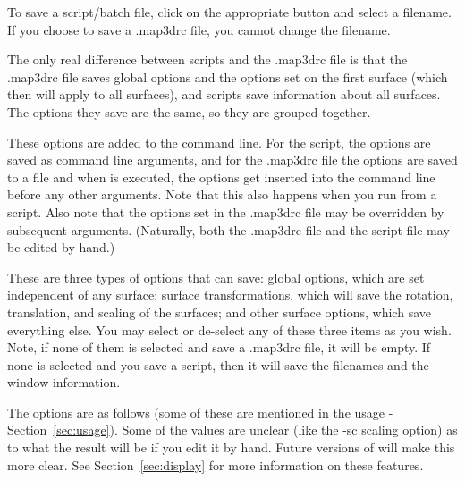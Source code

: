 To save a script/batch file, click on the appropriate button and select a
filename.  If you choose to save a .map3drc file, you cannot change the
filename.

The only real difference between scripts and the .map3drc file is that the
.map3drc file saves global options and the options set on the first surface
(which then will apply to all surfaces), and scripts save information about
all surfaces.  The options they save are the same, so they are grouped
together.

These options are added to the command line.  For the script, the options
are saved as command line arguments, and for the .map3drc file the options
are saved to a file and when \map{} is executed, the options get inserted
into the command line before any other arguments.  Note that this also
happens when you run \map{} from a script.  Also note that the options set
in the .map3drc file may be overridden by subsequent arguments.
(Naturally, both the .map3drc file and the script file may be edited by
hand.)

These are three types of options that \map{} can save: global options,
which are set independent of any surface; surface transformations, which
will save the rotation, translation, and scaling of the surfaces; and other
surface options, which save everything else.  You may select or de-select
any of these three items as you wish.  Note, if none of them is selected
and save a .map3drc file, it will be empty.  If none is selected and you
save a script, then it will save the filenames and the window information.

The options are as follows (some of these are mentioned in the usage -
Section~\ref{sec:usage}).  Some of the values are unclear (like the -sc
scaling option) as to what the result will be if you edit it by hand.
Future versions of \map{} will make this more clear.  See
Section~\ref{sec:display} for more information on these features.

